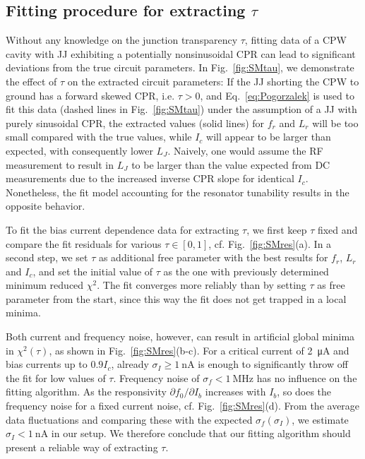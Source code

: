 \subsection{Fitting procedure for extracting $\tau$}

Without any knowledge on the junction transparency $\tau$, fitting data of a CPW cavity with JJ exhibiting a potentially nonsinusoidal CPR can lead to significant deviations from the true circuit parameters.
%
In Fig.~\ref{fig:SMtau}, we demonstrate the effect of $\tau$ on the extracted circuit parameters:
%
If the JJ shorting the CPW to ground has a forward skewed CPR, i.e. $\tau>0$, and Eq.~\ref{eq:Pogorzalek} is used to fit this data (dashed lines in Fig.~\ref{fig:SMtau}) under the assumption of a JJ with purely sinusoidal CPR, the extracted values (solid lines) for $f_r$ and $L_r$ will be too small compared with the true values, while $I_c$ will appear to be larger than expected, with consequently lower $L_J$.
%
Naively, one would assume the RF measurement to result in $L_J$ to be larger than the value expected from DC measurements due to the increased inverse CPR slope for identical $I_c$.
%
Nonetheless, the fit model accounting for the resonator tunability results in the opposite behavior.

To fit the bias current dependence data for extracting $\tau$, we first keep $\tau$ fixed and compare the fit residuals for various $\tau\in[0,1]$, cf. Fig.~\ref{fig:SMres}(a).
%
In a second step, we set $\tau$ as additional free parameter with the best results for $f_r$, $L_r$ and $I_c$, and set the initial value of $\tau$ as the one with previously determined minimum reduced $\chi^2$.
%
The fit converges more reliably than by setting $\tau$ as free parameter from the start, since this way the fit does not get trapped in a local minima.

Both current and frequency noise, however, can result in artificial global minima in $\chi^2(\tau)$, as shown in Fig.~\ref{fig:SMres}(b-c).
%
For a critical current of \SI{2}{\micro\ampere} and bias currents up to $0.9I_c$, already $\sigma_I\geq\SI{1}{\nano\ampere}$ is enough to significantly throw off the fit for low values of $\tau$.
%
Frequency noise of $\sigma_f<\SI{1}{\mega\hertz}$ has no influence on the fitting algorithm.
%
As the responsivity $\partial f_0/\partial I_b$ increases with $I_b$, so does the frequency noise for a fixed current noise, cf. Fig.~\ref{fig:SMres}(d).
%
From the average data fluctuations and comparing these with the expected $\sigma_f(\sigma_I)$, we estimate $\sigma_I<\SI{1}{\nano\ampere}$ in our setup.
%
We therefore conclude that our fitting algorithm should present a reliable way of extracting $\tau$. 


